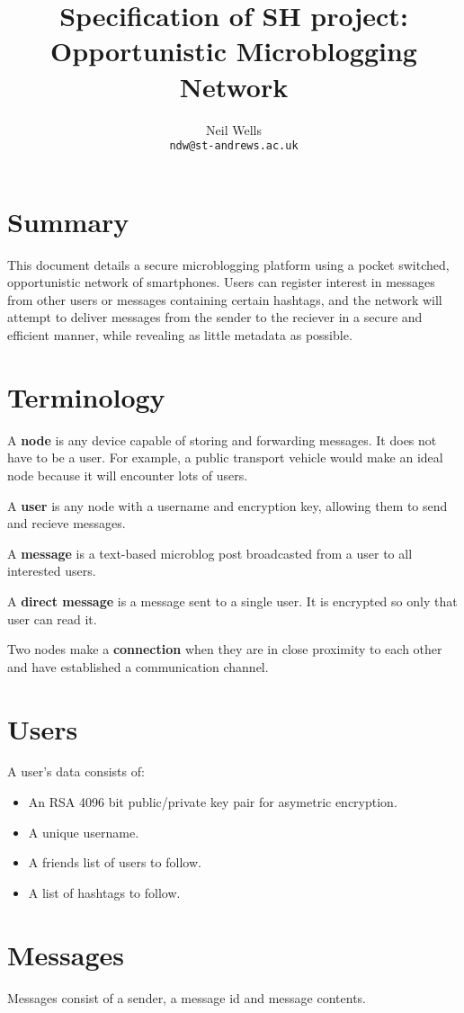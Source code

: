 \documentclass{article}
\title{\textbf{Specification of SH project: Opportunistic Microblogging Network}}
\author{Neil Wells\\
\texttt{ndw@st-andrews.ac.uk}}
\date{}
\begin{document}
\maketitle

\section*{Summary}
This document details a secure microblogging platform using a pocket switched, opportunistic network of smartphones. Users can register interest in messages from other users or messages containing certain hashtags, and the network will attempt to deliver messages from the sender to the reciever in a secure and efficient manner, while revealing as little metadata as possible.


\section*{Terminology}
A \textbf{node} is any device capable of storing and forwarding messages. It does not have to be a user. For example, a public transport vehicle would make an ideal node because it will encounter lots of users.

A \textbf{user} is any node with a username and encryption key, allowing them to send and recieve messages.

A \textbf{message} is a text-based microblog post broadcasted from a user to all interested users.

A \textbf{direct message} is a message sent to a single user. It is encrypted so only that user can read it.

Two nodes make a \textbf{connection} when they are in close proximity to each other and have established a communication channel.

\section*{Users}
A user's data consists of:
\begin{itemize}
\item An RSA 4096 bit public/private key pair for asymetric encryption.
\item A unique username.
\item A friends list of users to follow.
\item A list of hashtags to follow.
\end{itemize}

\section*{Messages}
Messages consist of a sender, a message id and message contents.
\end{document}
